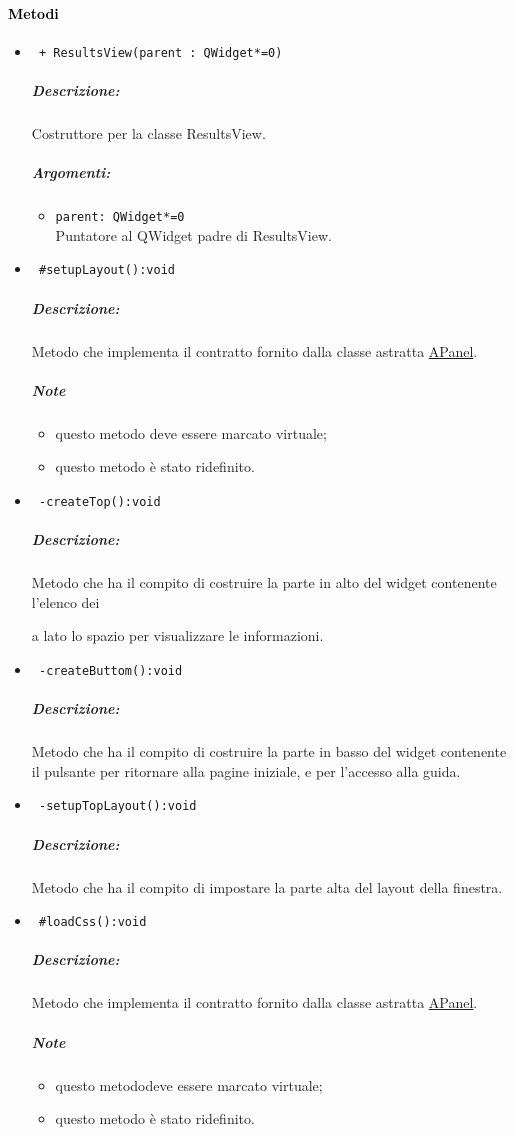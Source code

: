 \paragraph{\textcolor{black}{Metodi\\}}
\begin{itemize}
\item\color{blue}\verb! + ResultsView(parent : QWidget*=0)!
\color{black}
\subparagraph{Descrizione:} Costruttore per la classe ResultsView. 
\subparagraph{Argomenti:}
\begin{itemize}
\item \color{RoyalPurple}\verb!parent: QWidget*=0  !\\ Puntatore al QWidget padre di ResultsView.
\end{itemize}

\item\color{blue}\verb! #setupLayout():void!
\color{black} 
\subparagraph{Descrizione:} Metodo che implementa il contratto fornito dalla classe astratta \hyperref[speAPanel]{APanel}.
\subparagraph{Note}
\begin{itemize}
\item questo metodo deve essere marcato virtuale;
\item questo metodo è stato ridefinito.
\end{itemize}
 
\item\color{blue}\verb! -createTop():void!
\color{black}
\subparagraph{Descrizione:} Metodo che ha il compito di costruire la parte in alto del widget contenente l'elenco dei \subject e a lato lo spazio per visualizzare le informazioni.
 
\item\color{blue}\verb! -createButtom():void!
\color{black}
\subparagraph{Descrizione:} Metodo che ha il compito di costruire la parte in basso del widget contenente il pulsante per ritornare alla pagine iniziale, e per l'accesso alla guida.

\item\color{blue}\verb! -setupTopLayout():void!
\color{black}
\subparagraph{Descrizione:} Metodo che ha il compito di impostare la parte alta del layout della finestra.
  
\item\color{blue}\verb! #loadCss():void!
\color{black}
\subparagraph{Descrizione:} Metodo che implementa il contratto fornito dalla classe astratta \hyperref[speAPanel]{APanel}.
 \subparagraph{Note}
 \begin{itemize}
  \item questo metododeve essere marcato virtuale;
 \item questo metodo è stato ridefinito.
 \end{itemize}
 

\end{itemize}
